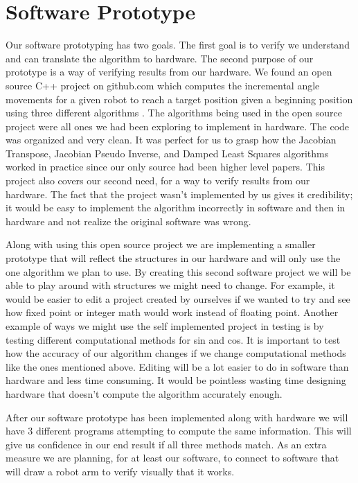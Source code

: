 \section{Software Prototype}
Our software prototyping has two goals. The first goal is to verify we 
understand and can translate the algorithm to hardware. The second 
purpose of our prototype is a way of verifying results from our hardware.
We found an open source C++ project on github.com which computes the 
incremental angle movements for a given robot to reach a target position 
given a beginning position using three different algorithms 
\cite{ik_cpp_library}. The algorithms being used in the open source project 
were all ones we had been exploring to implement in hardware. The code was 
organized and very clean. It was perfect for us to grasp how the Jacobian 
Transpose, Jacobian Pseudo Inverse, and Damped Least Squares algorithms 
worked in practice since our only source had been higher level papers. This 
project also covers our second need, for a way to verify results from our 
hardware. The fact that the project wasn't implemented by us gives it 
credibility; it would be easy to implement the algorithm incorrectly in 
software and then in hardware and not realize the original software was 
wrong. 

Along with using this open source project we are implementing a smaller 
prototype that will reflect the structures in our hardware and will only 
use the one algorithm we plan to use. By creating this second software 
project we will be able to play around with structures we might need to 
change. For example, it would be easier to edit a project created by 
ourselves if we wanted to try and see how fixed point or integer math 
would work instead of floating point. Another example of ways we might use 
the self implemented project in testing is by testing different 
computational methods for sin and cos. It is important to test how the 
accuracy of our algorithm changes if we change computational methods like 
the ones mentioned above. Editing will be a lot easier to do in software 
than hardware and less time consuming. It would be pointless wasting time 
designing hardware that doesn't compute the algorithm accurately enough. 

After our software prototype has been implemented along with hardware 
we will have 3 different programs attempting to compute the same 
information. This will give us confidence in our end result if all three 
methods match. As an extra measure we are planning, for at least our 
software, to connect to software that will draw a robot arm to verify 
visually that it works. 
